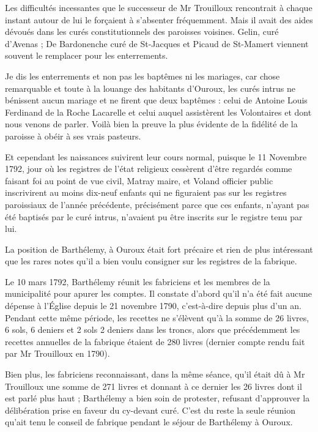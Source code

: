 Les difficultés incessantes que le successeur de Mr Trouilloux
rencontrait à chaque instant autour de lui le forçaient à s'absenter
fréquemment. Mais il avait des aides dévoués dans les curés constitutionnels des paroisses voisines. Gelin, curé d'Avenas ; De Bardonenche curé de St-Jacques et Picaud de St-Mamert viennent souvent le remplacer pour les enterrements.

Je dis les enterrements et non pas les baptêmes ni les mariages, car chose remarquable et toute à la louange des habitants d'Ouroux, les curés intrus ne bénissent aucun mariage et ne firent que deux baptêmes : celui de Antoine Louis Ferdinand de la Roche Lacarelle et celui auquel assistèrent les Volontaires et dont nous venons de parler. Voilà bien la preuve la plus évidente de la fidélité de la paroisse à obéir à ses vrais pasteurs.

Et cependant les naissances suivirent leur cours normal, puisque le 11 Novembre 1792, jour où les registres de l'état religieux cessèrent d'être regardés comme faisant foi au point de vue civil, Matray maire, et Voland officier public inscrivirent au moins dix-neuf enfants qui ne figuraient pas sur les registres paroissiaux de l'année précédente, précisément parce que ces enfants, n'ayant pas été baptisés par le curé intrus, n'avaient pu être inscrits sur le registre tenu par lui.

La position de Barthélemy, à Ouroux était fort précaire et rien de plus intéressant que les rares notes qu'il a bien voulu consigner sur les registres de la fabrique.

Le 10 mars 1792, Barthélemy réunit les fabriciens et les membres de la municipalité pour apurer les comptes. Il constate d'abord qu'il n'a été fait aucune dépense à l'Église depuis le 21 novembre 1790, c'est-à-dire depuis plus d'un an. Pendant cette même période, les recettes ne s'élèvent qu'à la somme de 26 livres, 6 sols, 6 deniers et 2 sols 2 deniers dans les troncs, alors que précédemment les recettes annuelles de la fabrique étaient de 280 livres (dernier compte rendu fait par Mr Trouilloux en 1790).

Bien plus, les fabriciens reconnaissant, dans la même séance, qu'il était dû à Mr Trouilloux une somme de 271 livres et donnant à ce dernier les 26 livres dont il est parlé plus haut ; Barthélemy a bien soin de protester, refusant d'approuver la délibération prise en faveur du cy-devant curé. C'est du reste la seule réunion qu'ait
tenu le conseil de fabrique pendant le séjour de Barthélemy à Ouroux.

